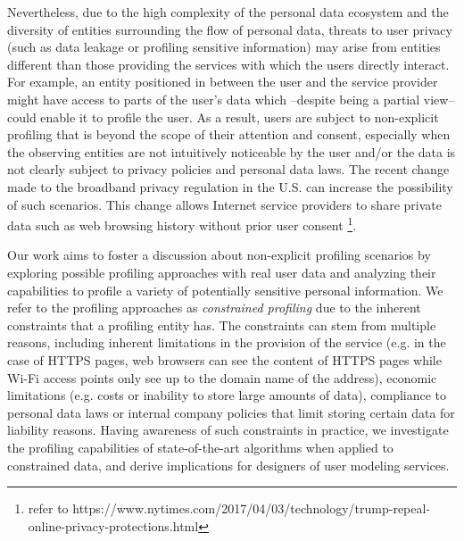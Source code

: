 Nevertheless, due to the high complexity of the personal data ecosystem and the diversity of entities surrounding the flow of personal data, threats to user privacy (such as data leakage or profiling sensitive information) may arise from entities different than those providing the services with which the users directly interact. For example, an entity positioned in between the user and the service provider might have access to parts of the user's data which --despite being a partial view-- could enable it to profile the user. As a result, users are subject to non-explicit profiling that is beyond the scope of their attention and consent, especially when the observing entities are not intuitively noticeable by the user and/or the data is not clearly subject to privacy policies and personal data laws. The recent change made to the broadband privacy regulation in the U.S. can increase the possibility of such scenarios. This change allows Internet service providers to share private data such as web browsing history without prior user consent \footnote{refer to https://www.nytimes.com/2017/04/03/technology/trump-repeal-online-privacy-protections.html}. 

Our work aims to foster a discussion about non-explicit profiling scenarios by exploring possible profiling approaches with real user data and analyzing their capabilities to profile a variety of potentially sensitive personal information. We refer to the profiling approaches as \textit{constrained profiling} due to the inherent constraints that a profiling entity has. The constraints can stem from multiple reasons, including inherent limitations in the provision of the service (e.g. in the case of HTTPS pages, web browsers can see the content of HTTPS pages while Wi-Fi access points only see up to the domain name of the address), economic limitations (e.g. costs or inability to store large amounts of data), compliance to personal data laws or internal company policies that limit storing certain data for liability reasons. Having awareness of such constraints in practice, we investigate the profiling capabilities of state-of-the-art algorithms when applied to constrained data, and derive implications for designers of user modeling services.

